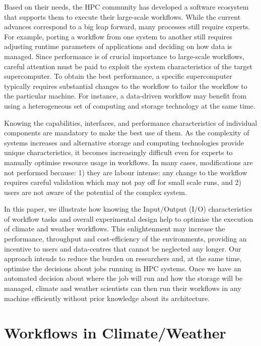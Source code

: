 \documentclass{superfri}
\begin{document}
Based on their needs, the HPC community has developed a software ecosystem that supports them to execute their large-scale workflows.
While the current advances correspond to a big leap forward, many processes still require experts.
For example, porting a workflow from one system to another still requires adjusting runtime parameters of applications and deciding on how data is managed.
Since performance is of crucial importance to large-scale workflows, careful attention must be paid to exploit the system characteristics of the target supercomputer.
To obtain the best performance, a specific supercomputer typically requires substantial changes to the workflow to tailor the workflow to the particular machine.
For instance, a data-driven workflow may benefit from using a heterogeneous set of computing and storage technology at the same time.

Knowing the capabilities, interfaces, and performance characteristics of individual components are mandatory to make the best use of them.
As the complexity of systems increases and alternative storage and computing technologies provide unique characteristics, it becomes increasingly difficult even for experts to manually optimise resource usage in workflows.
In many cases, modifications are not performed because: 1) they are labour intense: any change to the workflow requires careful validation which may not pay off for small scale runs, and 2) users are not aware of the potential of the complex system.

In this paper, we illustrate how knowing the Input/Output (I/O) characteristics of workflow tasks and overall experimental design help to optimise the execution of climate and weather workflows. This enlightenment may increase the performance, throughput and cost-efficiency of the environments, providing an incentive to users and data-centres that cannot be neglected any longer.
Our approach intends to reduce the burden on researchers and, at the same time, optimise the decisions about jobs running in HPC systems.
Once we have an automated decision about where the job will run and how the storage will be managed, climate and weather scientists can then run their workflows in any machine efficiently without prior knowledge about its architecture.

\section{Workflows in Climate/Weather}
\label{sec:workflows}
\end{document}
